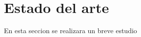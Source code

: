 \chapter{Estado del arte}
\label{estado del arte}

En esta seccion se realizara un breve estudio 



